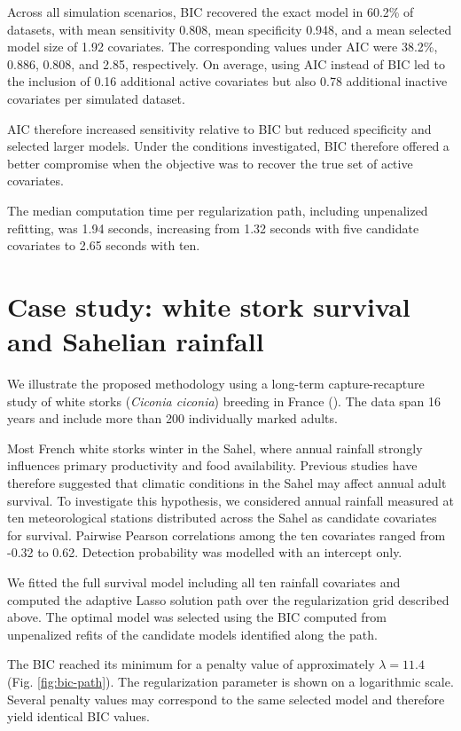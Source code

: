 \documentclass[
  11pt,
  a4paper,
]{article}
\begin{document}
Across all simulation scenarios, BIC recovered the exact model in 60.2\% of datasets, with mean sensitivity 0.808, mean specificity 0.948, and a mean selected model size of 1.92 covariates. The corresponding values under AIC were 38.2\%, 0.886, 0.808, and 2.85, respectively. On average, using AIC instead of BIC led to the inclusion of 0.16 additional active covariates but also 0.78 additional inactive covariates per simulated dataset.

AIC therefore increased sensitivity relative to BIC but reduced specificity and selected larger models. Under the conditions investigated, BIC therefore offered a better compromise when the objective was to recover the true set of active covariates.

The median computation time per regularization path, including unpenalized refitting, was 1.94 seconds, increasing from 1.32 seconds with five candidate covariates to 2.65 seconds with ten.

\section{Case study: white stork survival and Sahelian rainfall}\label{case-study}

We illustrate the proposed methodology using a long-term capture-recapture study of white storks (\emph{Ciconia ciconia}) breeding in France (). The data span 16 years and include more than 200 individually marked adults.

Most French white storks winter in the Sahel, where annual rainfall strongly influences primary productivity and food availability. Previous studies have therefore suggested that climatic conditions in the Sahel may affect annual adult survival. To investigate this hypothesis, we considered annual rainfall measured at ten meteorological stations distributed across the Sahel as candidate covariates for survival. Pairwise Pearson correlations among the ten covariates ranged from -0.32 to 0.62. Detection probability was modelled with an intercept only.

We fitted the full survival model including all ten rainfall covariates and computed the adaptive Lasso solution path over the regularization grid described above. The optimal model was selected using the BIC computed from unpenalized refits of the candidate models identified along the path.

The BIC reached its minimum for a penalty value of approximately \(\lambda = 11.4\) (Fig. \ref{fig:bic-path}). The regularization parameter is shown on a logarithmic scale. Several penalty values may correspond to the same selected model and therefore yield identical BIC values.
\end{document}
